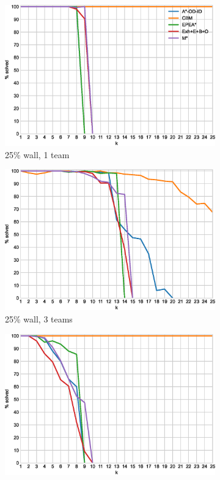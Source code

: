 \documentclass[english,10pt]{article}
\begin{document}
	\begin{figure}[b]
		\centering
		\begin{subfigure}{0.44\textwidth}
			\centering
			\includegraphics[width=\linewidth]{img/results/relative-comparison/25-1-p}
			\caption{25\% wall, 1 team}
			\label{fig:r-25-1-p}
		\end{subfigure}
		\begin{subfigure}{0.44\textwidth}
			\centering
			\includegraphics[width=\linewidth]{img/results/relative-comparison/25-3-p}
			\caption{25\% wall, 3 teams}
			\label{fig:r-25-3-p}
		\end{subfigure}
		\begin{subfigure}{0.44\textwidth}
			\centering
			\includegraphics[width=\linewidth]{img/results/relative-comparison/75-1-p}

\end{subfigure}
\end{figure}
\end{document}
